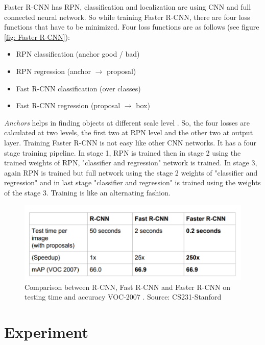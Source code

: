 \documentclass{report}
\begin{document}
Faster R-CNN has RPN, classification and localization are using CNN and full connected neural network. So while training Faster R-CNN, there are four loss functions that have to be minimized. Four loss functions are  as follows (see figure \ref{fig: Faster R-CNN}):
\begin{itemize}
  \item RPN classification (anchor good / bad)
  \item RPN regression (anchor 	$\rightarrow$ proposal)
  \item Fast R-CNN classification (over classes)
  \item Fast R-CNN regression (proposal $\rightarrow$ box)
\end{itemize}

\textit{Anchors} helps in finding objects at different scale level \cite{ren2015faster} . So, the four losses are calculated at two levels, the first two at RPN level and the other two at output layer. Training Faster R-CNN is not easy like other CNN networks. It has a four stage training  \cite{ren2015faster} pipeline. In stage 1, RPN is trained then in stage 2 using the trained weights of RPN, "classifier and regression" network is trained. In stage 3, again RPN is trained but full network using the stage 2 weights of "classifier and regression" and in last stage "classifier and regression" is trained using the weights of the stage 3. Training is like an alternating fashion.


\begin{figure}[H]
\includegraphics[width=0.85\linewidth]{campare-result-faster-rcnn.png}
\centering
\captionsetup{justification=centering}
\caption{Comparison between R-CNN, Fast R-CNN and Faster R-CNN on testing time and accuracy VOC-2007 \cite{ren2015faster} . Source: CS231-Stanford\protect\footnotemark}
\label{fig: Compare-Dection-Time-Result-fasterrcnn}
\end{figure}


\section{Experiment}
\end{document}
